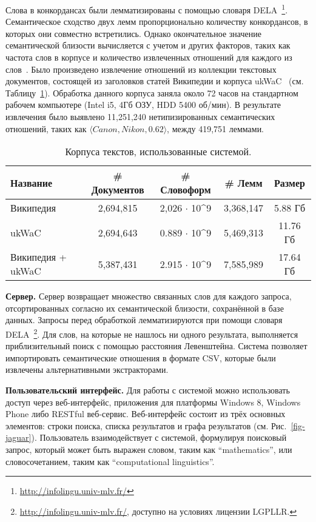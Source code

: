 \documentclass[a4paper,10pt,twoside]{article}
\begin{document}
Слова в конкордансах были лемматизированы с помощью словаря DELA~\footnote{\url{http://infolingu.univ-mlv.fr/}}. Семантическое сходство двух лемм пропорционально количеству конкордансов, в которых они совместно встретились. Однако окончательное значение семантической близости вычисляется с учетом и других факторов, таких как частота слов в корпусе и количество извлеченных отношений для каждого из слов~\cite{panchenko2012konvens}. Было произведено извлечение отношений из коллекции текстовых документов, состоящей из заголовков статей Википедии и корпуса ukWaC~\cite{baroni2009wacky} (см. Таблицу~\ref{tbl:corpora}). Обработка данного корпуса заняла около 72 часов на стандартном рабочем компьютере (Intel i5, 4Гб ОЗУ, HDD 5400 об/мин). В результате извлечения было выявлено 11,251,240 нетипизированных семантических отношений, таких как  $\langle Canon, Nikon, 0.62 \rangle$, между 419,751 леммами. 

\begin{table}
\centering
\footnotesize
\begin{tabular}{|l|c|c|c|c|}
  \hline              
  Название & \# Документов & \# Словоформ & \# Лемм &  Размер \\ \hline         \hline           
  Википедия & 2,694,815 & 2,026 $\cdot$ 10^9 & 3,368,147 & 5.88 Гб \\
  ukWaC & 2,694,643 & 0.889 $\cdot$ 10^9 & 5,469,313 & 11.76 Гб \\ 
  Википедия + ukWaC & 5,387,431 & 2.915 $\cdot$ 10^9 & 7,585,989 & 17.64 Гб\\
  \hline  
\end{tabular}
\caption{Корпуса текстов, использованные системой.}
\label{tbl:corpora}
\end{table}

\textbf{Сервер.} Сервер возвращает множество связанных слов для каждого запроса, отсортированных согласно их семантической близости, сохранённой в базе данных. Запросы перед обработкой лемматизируются при помощи словаря DELA~\footnote{\url{http://infolingu.univ-mlv.fr/}, доступно на условиях лицензии LGPLLR.}. Для слов, на которые не нашлось ни одного результата, выполняется приблизительный поиск с помощью расстояния Левенштейна. Система позволяет импортировать семантические отношения в формате CSV, которые были извлечены альтернативными экстракторами.

\textbf{Пользовательский интерфейс.} Для работы с системой можно использовать доступ через веб-интерфейс, приложения для платформы Windows 8, Windows Phone либо RESTful веб-сервис. Веб-интерфейс состоит из трёх основных элементов: строки поиска, списка результатов и графа результатов (см. Рис.~\ref{fig-jaguar}). Пользователь взаимодействует с системой, формулируя поисковый запрос, который может быть выражен словом, таким как ``mathematics'', или словосочетанием, таким как ``computational linguistics''. 
\end{document}
